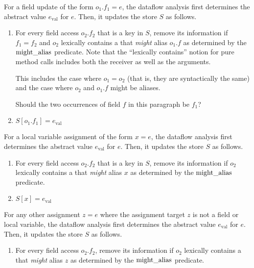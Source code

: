 
For a field update of the form $o_1.f_1 = e$, the
dataflow analysis first determines the abstract value $e_\text{val}$ for $e$.
Then, it updates the store $S$ as follows.
\begin{enumerate}
    \item For every field access $o_2.f_2$ that is a key in $S$, remove its
      information if $f_1 = f_2$ and
      $o_2$ lexically contains a  that \emph{might}
        alias $o_1.f$ as determined by the $\alias$
        predicate.
      Note that the ``lexically contains'' notion for pure method calls
        includes both the receiver as well as the arguments.

      This includes the case where $o_1 = o_2$ (that is, they are
      syntactically the same) and the case where  $o_2$ and $o_1.f$ might be
      aliases.

      \begin{workinprogress}
        Should the two occurrences of field $f$ in this paragraph be $f_1$?
      \end{workinprogress}

    \item $S[o_1.f_1] = e_\text{val}$
\end{enumerate}



For a local variable assignment of the form $x = e$,
the dataflow analysis first determines the abstract value $e_\text{val}$ for
$e$.
Then, it updates the store $S$ as follows.
\begin{enumerate}
    \item For every field access $o_2.f_2$ that is a key in $S$,
      remove its information if $o_2$ lexically contains a
       that \emph{might} alias $x$ as determined
      by the $\alias$ predicate.
    \item $S[x] = e_\text{val}$
\end{enumerate}


For any other assignment $z = e$ where the
assignment target $z$ is not a field or local variable,
the dataflow analysis first determines the abstract value $e_\text{val}$ for
$e$.
Then, it updates the store $S$ as follows.
\begin{enumerate}
    \item For every field access $o_2.f_2$, remove its information if
    $o_2$ lexically contains a  that \emph{might}
    alias $z$ as determined by the $\alias$ predicate.
\end{enumerate}


